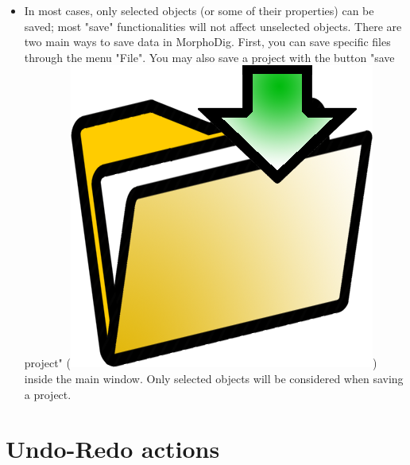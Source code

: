\begin{itemize}
\item In most cases, only selected objects (or some of their properties) can be saved; most "save" functionalities will not affect unselected objects. There are two main ways to save data in MorphoDig. First, you can save specific files through the menu "File". You may also save a project with the button "save project" (\includegraphics[scale=0.03]{images/03/save_data.png})  inside the main window. Only selected objects will be considered when saving a project.
\end{itemize}





\section{Undo-Redo actions}

